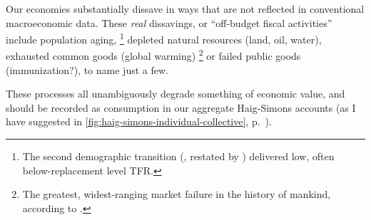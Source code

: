 Our economies substantially dissave in ways that are not reflected in conventional macroeconomic data.
These \emph{real} dissavings, or ``off-budget fiscal activities'' \cite[49]{Bonker2006} include population aging,
\footnote{
	The second demographic transition (\citealt{Davis1945}, restated by \citealt{Caldwell-1976-aa}) delivered low, often below-replacement level \gls{TFR}.
}
depleted natural resources (land, oil, water), exhausted common goods (global warming)
\footnote{
	The greatest, widest-ranging market failure in the history of mankind, according to \cite{Stern-2006-aa}.
}
or failed public goods (immunization?), to name just a few.

These processes all unambiguously degrade something of economic value, and should be recorded as consumption in our aggregate Haig-Simons accounts (as I have suggested in \autoref{fig:haig-simons-individual-collective}, p.~\pageref{fig:haig-simons-individual-collective}).

